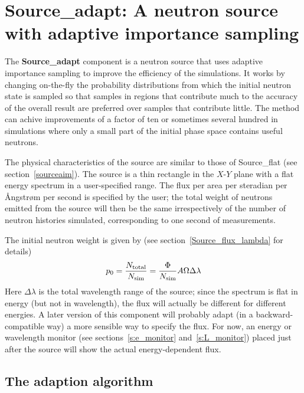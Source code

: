 
\section{Source\_adapt: A neutron source with adaptive importance sampling}
\label{s:Source_adapt}
\label{s:source_adapt}

The {\bf Source\_adapt} component is a neutron source that uses adaptive
importance sampling to improve the efficiency of the simulations. It
works by changing on-the-fly the probability distributions from which
the initial neutron state is sampled so that samples in regions that
contribute much to the accuracy of the overall result are preferred over
samples that contribute little. The method can achive improvements of a
factor of ten or sometimes several hundred in simulations where only a
small part of the initial phase space contains useful neutrons.

The physical characteristics of the source are similar to those of
Source\_flat (see section~\ref{sourceaim}). The source is a thin
rectangle in the $X$-$Y$ plane with a flat energy spectrum in a
user-specified range. The flux per area per steradian per
{\AA}ngstr{\o}m per second is specified by the user; the total weight of
neutrons emitted from the source will then be the same irrespectively of
the number of neutron histories simulated, corresponding to one second
of measurements.

The initial neutron weight is given by (see
section~\ref{Source_flux_lambda} for details)
$$ p_0 = \frac{N_{\rm total}}{N_{\rm sim}} = 
    \frac{\Phi}{N_{\rm sim}} A \Omega \Delta\lambda $$
Here $\Delta\lambda$ is the total wavelength range of the source; since
the spectrum is flat in energy (but not in wavelength), the flux
will actually be different for different energies. A later version of
this component will probably adapt (in a backward-compatible way) a more
sensible way to specify the flux. For now, an energy or wavelength
monitor (see sections~\ref{s:e_monitor} and~\ref{s:L_monitor}) placed
just after the source will show the actual energy-dependent flux.


\subsection{The adaption algorithm}

